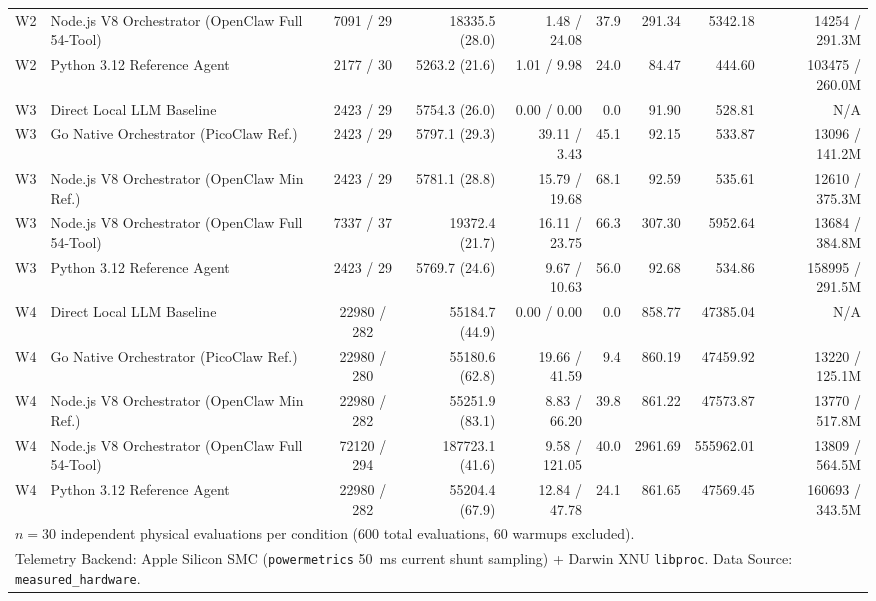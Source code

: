 \begin{table}[t]
\begin{tabular}{l l c r r r r r r}
W2 & Node.js V8 Orchestrator (OpenClaw Full 54-Tool) & 7091 / 29 & 18335.5 (28.0) & 1.48 / 24.08 & 37.9 & 291.34 & 5342.18 & 14254 / 291.3M \\
W2 & Python 3.12 Reference Agent & 2177 / 30 & 5263.2 (21.6) & 1.01 / 9.98 & 24.0 & 84.47 & 444.60 & 103475 / 260.0M \\
\hline
W3 & Direct Local LLM Baseline & 2423 / 29 & 5754.3 (26.0) & 0.00 / 0.00 & 0.0 & 91.90 & 528.81 & N/A \\
W3 & Go Native Orchestrator (PicoClaw Ref.) & 2423 / 29 & 5797.1 (29.3) & 39.11 / 3.43 & 45.1 & 92.15 & 533.87 & 13096 / 141.2M \\
W3 & Node.js V8 Orchestrator (OpenClaw Min Ref.) & 2423 / 29 & 5781.1 (28.8) & 15.79 / 19.68 & 68.1 & 92.59 & 535.61 & 12610 / 375.3M \\
W3 & Node.js V8 Orchestrator (OpenClaw Full 54-Tool) & 7337 / 37 & 19372.4 (21.7) & 16.11 / 23.75 & 66.3 & 307.30 & 5952.64 & 13684 / 384.8M \\
W3 & Python 3.12 Reference Agent & 2423 / 29 & 5769.7 (24.6) & 9.67 / 10.63 & 56.0 & 92.68 & 534.86 & 158995 / 291.5M \\
\hline
W4 & Direct Local LLM Baseline & 22980 / 282 & 55184.7 (44.9) & 0.00 / 0.00 & 0.0 & 858.77 & 47385.04 & N/A \\
W4 & Go Native Orchestrator (PicoClaw Ref.) & 22980 / 280 & 55180.6 (62.8) & 19.66 / 41.59 & 9.4 & 860.19 & 47459.92 & 13220 / 125.1M \\
W4 & Node.js V8 Orchestrator (OpenClaw Min Ref.) & 22980 / 282 & 55251.9 (83.1) & 8.83 / 66.20 & 39.8 & 861.22 & 47573.87 & 13770 / 517.8M \\
W4 & Node.js V8 Orchestrator (OpenClaw Full 54-Tool) & 72120 / 294 & 187723.1 (41.6) & 9.58 / 121.05 & 40.0 & 2961.69 & 555962.01 & 13809 / 564.5M \\
W4 & Python 3.12 Reference Agent & 22980 / 282 & 55204.4 (67.9) & 12.84 / 47.78 & 24.1 & 861.65 & 47569.45 & 160693 / 343.5M \\
\hline
\multicolumn{9}{l}{\footnotesize $n = 30$ independent physical evaluations per condition (600 total evaluations, 60 warmups excluded).} \\
\multicolumn{9}{l}{\footnotesize Telemetry Backend: Apple Silicon SMC (\texttt{powermetrics} 50~ms current shunt sampling) + Darwin XNU \texttt{libproc}. Data Source: \texttt{measured\_hardware}.} \\
\hline
\end{tabular}
\end{table}
